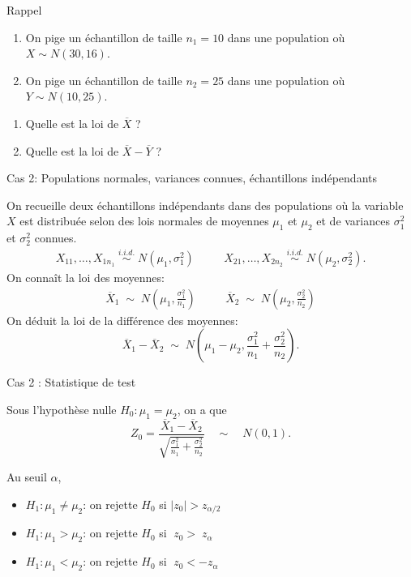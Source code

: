 \documentclass{BeamerTemplate}
\begin{document}
\begin{frame}[t]{Rappel}


\begin{enumerate}[$\bullet$]\itemsep 2mm
\item On pige un échantillon de taille $n_1=10$ dans une population où $X\sim N(30, 16)$.
\item On pige un échantillon de taille $n_2=25$ dans une population où $Y\sim N(10, 25)$.
\end{enumerate}

\vspace{6mm}

\begin{enumerate}\itemsep 5mm
\item Quelle est la loi de $\overline X$ ?
\item Quelle est la loi de $\overline X - \overline Y $ ?
\end{enumerate}
\vspace{1cm}

\end{frame}
\begin{frame}[t]{Cas 2: Populations normales, variances connues, échantillons indépendants}

On recueille \alert{deux échantillons indépendants} dans des populations où la variable $X$ est  distribuée selon des lois normales de moyennes $\mu_1$ et $\mu_2$ et de variances $\sigma^2_1$ et $\sigma^2_2$ \alert{connues}.
\begin{align*}
X_{11}, \ldots, X_{1n_1}\; \overset{i.i.d.}{\sim} \;N(\mu_1, \sigma^2_1) & \quad &  X_{21}, \ldots, X_{2n_2} \;\overset{i.i.d.}{\sim}\; N(\mu_2, \sigma^2_2).
\end{align*}
On connaît la loi des moyennes:
\begin{align*}
\overline{X}_1 %
\;\sim \;N\left(\mu_1, \frac{\sigma_1^2}{n_1} \right) &\quad &
\overline{X}_2 %
\;\sim\; N\left(\mu_2, \frac{\sigma_2^2}{n_2}\right)
\end{align*}
On déduit la loi de la différence des moyennes:
$$\overline{X}_1 - \overline{X}_2 \;\sim\; N\left( \mu_1 - \mu_2, \frac{\sigma^2_1}{n_1} + \frac{\sigma^2_2}{n_2} \right). $$
\end{frame}

\begin{frame}[t]{Cas 2 : Statistique de test}

{\small
Sous l'hypothèse nulle $H_0 : \mu_1 = \mu_2$, on a que
$$
Z_0 = \frac{\overline{X}_1 - \overline{X}_2 }{\sqrt{\frac{\sigma^2_1}{n_1} + \frac{\sigma^2_2}{n_2} }} \quad \sim \quad N(0,1).
$$

Au seuil $\alpha$,

\begin{itemize}\itemsep4mm
\item $H_1 : \mu_1 \ne \mu_2$: on rejette $H_0$ si $|z_0| > z_{\alpha/2}$
\item $H_1 : \mu_1 > \mu_2$: on rejette $H_0$ si $\;z_0 > \;z_{\alpha}$
\item $H_1 : \mu_1 < \mu_2$: on rejette $H_0$ si $\;z_0 < -z_{\alpha}$
\end{itemize}
}
\end{frame}
\end{document}
